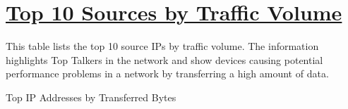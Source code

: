 %
%
%

\chapter[Top 10 Sources by Traffic Volume]{\underline{Top 10 Sources by Traffic Volume}}
\begin{flushleft}
This table lists the top 10 source IPs by traffic volume. The information highlights Top Talkers in the network and show devices causing potential performance problems in a network by transferring a high amount of data.
\end{flushleft}

\begin{table}[H]
  \begin{center}
    \caption[\normalsize{Top IP Addresses by Transferred Bytes}]{\small{Top IP Addresses by Transferred Bytes}}
  \end{center}
\end{table}

